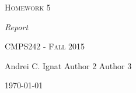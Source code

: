 \documentclass{article}
\begin{document}
\begin{center}
\Huge{\textsc{Homework 5}} 

\normalsize{\textsl{Report}}

\Large\textsc{CMPS242 - Fall 2015}

\large{\hfill Andrei  C. Ignat \hfill Author 2 \hfill Author 3 \hfill}

\normalsize\flushright\today
\end{center}
\vfill
\end{document}
